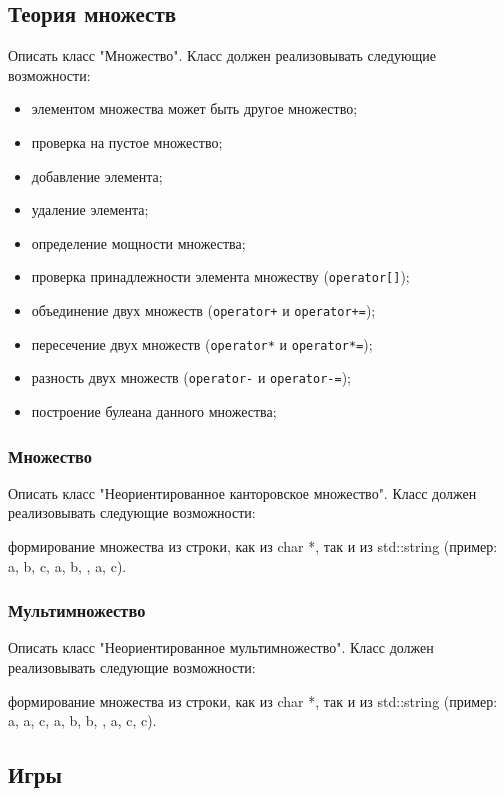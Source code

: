 \documentclass[a4paper,12pt]{article}
\begin{document}
\subsection{Теория множеств}

Описать класс "Множество".
Класс должен реализовывать следующие возможности:

\begin{itemize}
\item элементом множества может быть другое множество;
\item проверка на пустое множество;
\item добавление элемента;
\item удаление элемента;
\item определение мощности множества;
\item проверка принадлежности элемента множеству (\lstinline|operator[]|);
\item объединение двух множеств (\lstinline|operator+| и \lstinline|operator+=|);
\item пересечение двух множеств (\lstinline|operator*| и \lstinline|operator*=|);
\item разность двух множеств (\lstinline|operator-| и \lstinline|operator-=|);
\item построение булеана данного множества;
\end{itemize}

\subsubsection{Множество}

Описать класс "Неориентированное канторовское множество".  Класс
должен реализовывать следующие возможности:

формирование множества из строки, как из char *, так и из std::string (пример: {a, b, c, {a, b}, {}, {a, {c}}}). 

\subsubsection{Мультимножество}

Описать класс "Неориентированное мультимножество".
Класс должен реализовывать следующие возможности:

формирование множества из строки, как из char *, так и из std::string (пример: {a, a, c, {a, b, b}, {}, {a, {c, c}}}). 


\subsection{Игры}
\end{document}
